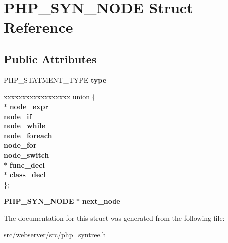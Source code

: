 \section{PHP\_\-SYN\_\-NODE Struct Reference}
\label{structPHP__SYN__NODE}
\subsection*{Public Attributes}
\begin{DoxyCompactItemize}
\item 
PHP\_\-STATMENT\_\-TYPE {\bfseries type}\label{structPHP__SYN__NODE_aa7062f2fc03faa62b24c60c7afffd677}

\item 
\begin{tabbing}
xx\=xx\=xx\=xx\=xx\=xx\=xx\=xx\=xx\=\kill
union \{\\
 $\ast$ {\bfseries node\_expr}\\
 {\bfseries node\_if}\\
 {\bfseries node\_while}\\
 {\bfseries node\_foreach}\\
 {\bfseries node\_for}\\
 {\bfseries node\_switch}\\
 $\ast$ {\bfseries func\_decl}\\
 $\ast$ {\bfseries class\_decl}\\
\}; \label{structPHP__SYN__NODE_ae2a58f9016593cf196f197473c39d42f}
\\

\end{tabbing}\item 
{\bf PHP\_\-SYN\_\-NODE} $\ast$ {\bfseries next\_\-node}\label{structPHP__SYN__NODE_a5673c2a78902d4d9a8843574e0ba8131}

\end{DoxyCompactItemize}


The documentation for this struct was generated from the following file:\begin{DoxyCompactItemize}
\item 
src/webserver/src/php\_\-syntree.h\end{DoxyCompactItemize}
